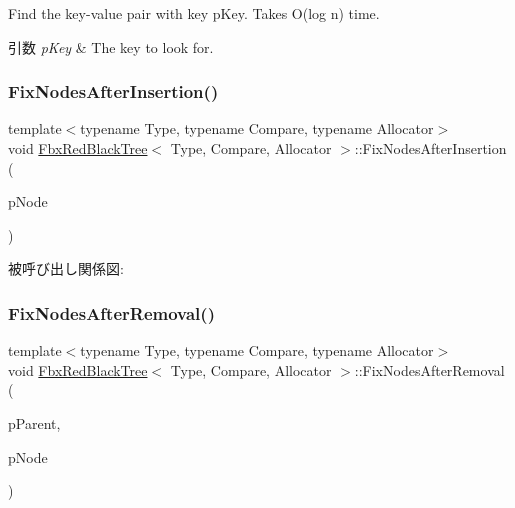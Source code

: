 Find the key-\/value pair with key p\+Key. Takes O(log n) time. 
\begin{DoxyParams}{引数}
{\em p\+Key} & The key to look for. \\
\hline
\end{DoxyParams}
\mbox{\label{class_fbx_red_black_tree_ac553d028cbea6ac90b0b42d161b5843c}} 
\subsubsection{\texorpdfstring{Fix\+Nodes\+After\+Insertion()}{FixNodesAfterInsertion()}}
{\footnotesize\ttfamily template$<$typename Type, typename Compare, typename Allocator$>$ \\
void \hyperlink{class_fbx_red_black_tree}{Fbx\+Red\+Black\+Tree}$<$ Type, Compare, Allocator $>$\+::Fix\+Nodes\+After\+Insertion (\begin{DoxyParamCaption}\item[{\hyperlink{class_fbx_red_black_tree_1_1_record_type}{Record\+Type} $\ast$}]{p\+Node }\end{DoxyParamCaption})\hspace{0.3cm}{\ttfamily [protected]}}

被呼び出し関係図\+:
\mbox{\label{class_fbx_red_black_tree_a3324d8304143f4d05160eab2aee1c6fa}} 
\subsubsection{\texorpdfstring{Fix\+Nodes\+After\+Removal()}{FixNodesAfterRemoval()}}
{\footnotesize\ttfamily template$<$typename Type, typename Compare, typename Allocator$>$ \\
void \hyperlink{class_fbx_red_black_tree}{Fbx\+Red\+Black\+Tree}$<$ Type, Compare, Allocator $>$\+::Fix\+Nodes\+After\+Removal (\begin{DoxyParamCaption}\item[{\hyperlink{class_fbx_red_black_tree_1_1_record_type}{Record\+Type} $\ast$}]{p\+Parent,  }\item[{\hyperlink{class_fbx_red_black_tree_1_1_record_type}{Record\+Type} $\ast$}]{p\+Node }\end{DoxyParamCaption})\hspace{0.3cm}{\ttfamily [protected]}}


